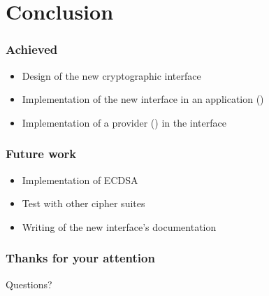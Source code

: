 \section{Conclusion}

\begin{frame}

\frametitle{Achieved}

\begin{itemize}
  \item Design of the new cryptographic interface
  \item Implementation of the new interface in an application (\embtls)
  \item Implementation of a provider (\tomcrypt) in the interface 
\end{itemize}

\end{frame}

\begin{frame}

\frametitle{Future work}

\begin{itemize}
  \item Implementation of ECDSA
  \item Test with other cipher suites
  \item Writing of the new interface's documentation
\end{itemize}

\end{frame}

\begin{frame}

\frametitle{Thanks for your attention}

\begin{center}

Questions?

\end{center}

\end{frame}
